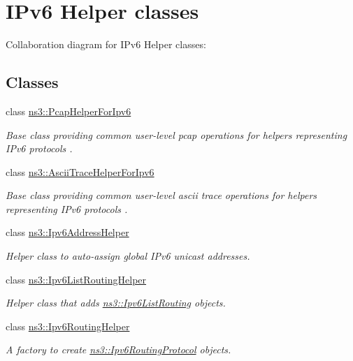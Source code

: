 \hypertarget{group__ipv6Helpers}{}\section{I\+Pv6 Helper classes}
\label{group__ipv6Helpers}
Collaboration diagram for I\+Pv6 Helper classes\+:
\subsection*{Classes}
\begin{DoxyCompactItemize}
\item 
class \hyperlink{classns3_1_1PcapHelperForIpv6}{ns3\+::\+Pcap\+Helper\+For\+Ipv6}
\begin{DoxyCompactList}\small\item\em Base class providing common user-\/level pcap operations for helpers representing I\+Pv6 protocols . \end{DoxyCompactList}\item 
class \hyperlink{classns3_1_1AsciiTraceHelperForIpv6}{ns3\+::\+Ascii\+Trace\+Helper\+For\+Ipv6}
\begin{DoxyCompactList}\small\item\em Base class providing common user-\/level ascii trace operations for helpers representing I\+Pv6 protocols . \end{DoxyCompactList}\item 
class \hyperlink{classns3_1_1Ipv6AddressHelper}{ns3\+::\+Ipv6\+Address\+Helper}
\begin{DoxyCompactList}\small\item\em Helper class to auto-\/assign global I\+Pv6 unicast addresses. \end{DoxyCompactList}\item 
class \hyperlink{classns3_1_1Ipv6ListRoutingHelper}{ns3\+::\+Ipv6\+List\+Routing\+Helper}
\begin{DoxyCompactList}\small\item\em Helper class that adds \hyperlink{classns3_1_1Ipv6ListRouting}{ns3\+::\+Ipv6\+List\+Routing} objects. \end{DoxyCompactList}\item 
class \hyperlink{classns3_1_1Ipv6RoutingHelper}{ns3\+::\+Ipv6\+Routing\+Helper}
\begin{DoxyCompactList}\small\item\em A factory to create \hyperlink{classns3_1_1Ipv6RoutingProtocol}{ns3\+::\+Ipv6\+Routing\+Protocol} objects. \end{DoxyCompactList}\item 

\end{DoxyCompactItemize}
